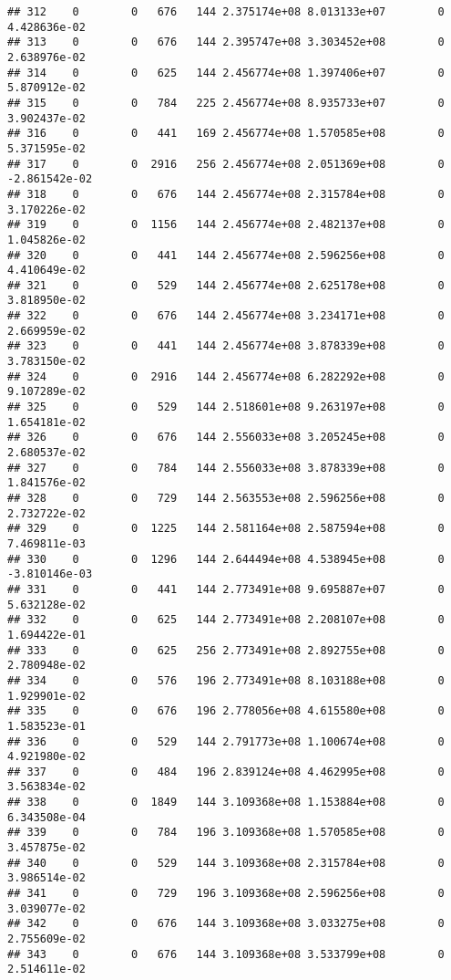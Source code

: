 \documentclass[
]{article}
\begin{document}
\begin{enumerate}
\begin{verbatim}
## 312    0        0   676   144 2.375174e+08 8.013133e+07        0  4.428636e-02
## 313    0        0   676   144 2.395747e+08 3.303452e+08        0  2.638976e-02
## 314    0        0   625   144 2.456774e+08 1.397406e+07        0  5.870912e-02
## 315    0        0   784   225 2.456774e+08 8.935733e+07        0  3.902437e-02
## 316    0        0   441   169 2.456774e+08 1.570585e+08        0  5.371595e-02
## 317    0        0  2916   256 2.456774e+08 2.051369e+08        0 -2.861542e-02
## 318    0        0   676   144 2.456774e+08 2.315784e+08        0  3.170226e-02
## 319    0        0  1156   144 2.456774e+08 2.482137e+08        0  1.045826e-02
## 320    0        0   441   144 2.456774e+08 2.596256e+08        0  4.410649e-02
## 321    0        0   529   144 2.456774e+08 2.625178e+08        0  3.818950e-02
## 322    0        0   676   144 2.456774e+08 3.234171e+08        0  2.669959e-02
## 323    0        0   441   144 2.456774e+08 3.878339e+08        0  3.783150e-02
## 324    0        0  2916   144 2.456774e+08 6.282292e+08        0  9.107289e-02
## 325    0        0   529   144 2.518601e+08 9.263197e+08        0  1.654181e-02
## 326    0        0   676   144 2.556033e+08 3.205245e+08        0  2.680537e-02
## 327    0        0   784   144 2.556033e+08 3.878339e+08        0  1.841576e-02
## 328    0        0   729   144 2.563553e+08 2.596256e+08        0  2.732722e-02
## 329    0        0  1225   144 2.581164e+08 2.587594e+08        0  7.469811e-03
## 330    0        0  1296   144 2.644494e+08 4.538945e+08        0 -3.810146e-03
## 331    0        0   441   144 2.773491e+08 9.695887e+07        0  5.632128e-02
## 332    0        0   625   144 2.773491e+08 2.208107e+08        0  1.694422e-01
## 333    0        0   625   256 2.773491e+08 2.892755e+08        0  2.780948e-02
## 334    0        0   576   196 2.773491e+08 8.103188e+08        0  1.929901e-02
## 335    0        0   676   196 2.778056e+08 4.615580e+08        0  1.583523e-01
## 336    0        0   529   144 2.791773e+08 1.100674e+08        0  4.921980e-02
## 337    0        0   484   196 2.839124e+08 4.462995e+08        0  3.563834e-02
## 338    0        0  1849   144 3.109368e+08 1.153884e+08        0  6.343508e-04
## 339    0        0   784   196 3.109368e+08 1.570585e+08        0  3.457875e-02
## 340    0        0   529   144 3.109368e+08 2.315784e+08        0  3.986514e-02
## 341    0        0   729   196 3.109368e+08 2.596256e+08        0  3.039077e-02
## 342    0        0   676   144 3.109368e+08 3.033275e+08        0  2.755609e-02
## 343    0        0   676   144 3.109368e+08 3.533799e+08        0  2.514611e-02

\end{verbatim}
\end{enumerate}
\end{document}
